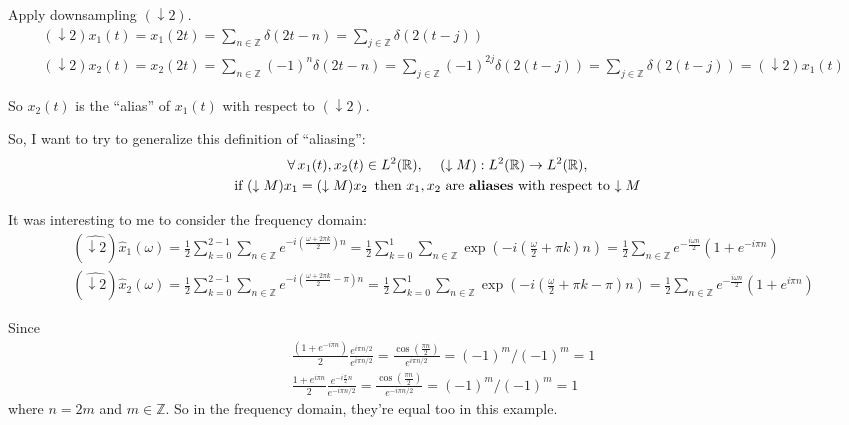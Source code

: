 \documentclass[twoside]{amsart}
\theoremstyle{plain}
\theoremstyle{definition}
\theoremstyle{remark}
\numberwithin{equation}{section}
\begin{document}
Apply downsampling $(\downarrow 2)$.  
\[
\begin{aligned}
  & (\downarrow 2)x_1(t) = x_1(2t) = \sum_{n\in \mathbb{Z}} \delta(2t-n) = \sum_{j\in \mathbb{Z}} \delta(2(t-j)) \\ 
  & (\downarrow 2)x_2(t) = x_2(2t) = \sum_{n\in \mathbb{Z}} (-1)^n\delta(2t-n) = \sum_{j\in \mathbb{Z}} (-1)^{2j} \delta(2(t-j)) = \sum_{j\in \mathbb{Z}} \delta(2(t-j)) = (\downarrow 2)x_1(t)
\end{aligned}
\]

So $x_2(t)$ is the ``alias'' of $x_1(t)$ with respect to $(\downarrow 2)$.  

So, I want to try to generalize this definition of ``aliasing'':
\[
\begin{gathered}
  \forall \, x_1(t), x_2(t) \in L^2(\mathbb{R}), \quad \, (\downarrow M): L^2(\mathbb{R}) \to L^2(\mathbb{R}),  \\ 
  \text{ if } (\downarrow M) x_1 = (\downarrow M) x_2 \, \text{ then } x_1, x_2 \text{ are \textbf{aliases} with respect to $\downarrow M$ }
\end{gathered}
\]

It was interesting to me to consider the frequency domain:
\[
\begin{aligned}
  & (\widehat{\downarrow 2})\widehat{x}_1(\omega) = \frac{1}{2} \sum_{k=0}^{2-1} \sum_{n\in \mathbb{Z}} e^{-i \left( \frac{\omega + 2\pi k }{2} \right) n } = \frac{1}{2} \sum_{k=0}^1 \sum_{n\in \mathbb{Z}} \exp{ \left( -i \left( \frac{\omega}{2} + \pi k \right) n \right) } = \frac{1}{2} \sum_{n\in\mathbb{Z}} e^{ - \frac{i \omega n }{2} } ( 1 + e^{-i \pi n } ) \\
  & (\widehat{\downarrow 2})\widehat{x}_2(\omega) = \frac{1}{2} \sum_{k=0}^{2-1} \sum_{n\in \mathbb{Z}} e^{-i \left( \frac{\omega + 2\pi k }{2} - \pi \right) n } = \frac{1}{2} \sum_{k=0}^1 \sum_{n\in \mathbb{Z}} \exp{ \left( -i \left( \frac{\omega}{2} + \pi k - \pi \right) n \right) } = \frac{1}{2} \sum_{n\in\mathbb{Z}} e^{ - \frac{i \omega n }{2} } ( 1 + e^{i \pi n } )
\end{aligned}
\]

Since 
\[
\begin{aligned}
  & \frac{(1+e^{-i\pi n})}{2} \frac{ e^{i \pi n /2} }{e^{i \pi n /2}} = \frac{ \cos{ \left( \frac{ \pi n }{2} \right) } }{ e^{i \pi n /2} } = (-1)^m /(-1)^m = 1 \\ 
  &  \frac{ 1 + e^{i \pi n }}{2} \frac{ e^{-i \frac{ \pi }{2} n } }{ e^{-i \pi n /2}} = \frac{ \cos{ \left( \frac{ \pi n }{2} \right) } }{ e^{-i \pi n /2}} = (-1)^m / (-1)^m = 1 
\end{aligned}
\]
where $n = 2m$ and $m\in \mathbb{Z}$.  So in the frequency domain, they're equal too in this example.  
\end{document}
